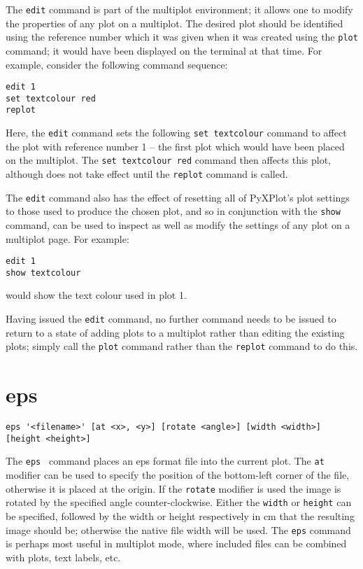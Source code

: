 \documentclass[a4paper,onecolumn,11pt]{book}
\begin{document}
The {\tt edit} command is part of the multiplot environment; it allows one to
modify the properties of any plot on a multiplot. The desired plot should be
identified using the reference number which it was given when it was created
using the {\tt plot} command; it would have been displayed on the terminal at
that time. For example, consider the following command sequence:

\begin{verbatim}
edit 1
set textcolour red
replot
\end{verbatim}

Here, the {\tt edit} command sets the following {\tt set textcolour} command to
affect the plot with reference number 1 -- the first plot which would have been
placed on the multiplot. The {\tt set textcolour red} command then affects this
plot, although does not take effect until the {\tt replot} command is called.

The {\tt edit} command also has the effect of resetting all of PyXPlot's plot
settings to those used to produce the chosen plot, and so in conjunction with
the {\tt show} command, can be used to inspect as well as modify the settings of
any plot on a multiplot page. For example:

\begin{verbatim}
edit 1
show textcolour
\end{verbatim}

\noindent would show the text colour used in plot 1.

Having issued the {\tt edit} command, no further command needs to be issued to
return to a state of adding plots to a multiplot rather than editing the
existing plots; simply call the {\tt plot} command rather than the {\tt replot}
command to do this.


\section{eps}

\begin{verbatim}
eps '<filename>' [at <x>, <y>] [rotate <angle>] [width <width>] [height <height>]
\end{verbatim}

The {\tt eps } command places an eps format file into the current plot.  The
{\tt at} modifier can be used to specify the position of the bottom-left corner
of the file, otherwise it is placed at the origin.  If the {\tt rotate} modifier
is used the image is rotated by the specified angle counter-clockwise.  Either
the {\tt width} or {\tt height} can be specified, followed by the width or
height respectively in cm that the resulting image should be; otherwise the
native file width will be used.  The {\tt eps} command is perhaps most useful in
multiplot mode, where included files can be combined with plots, text labels,
etc.
\end{document}
